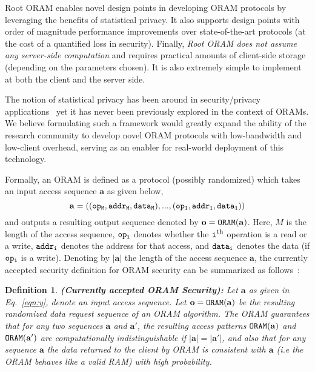 \documentclass[USenglish,oneside,twocolumn]{article}
\makeatletter
\newcommand{\ourprotocol}{Root ORAM}
\let\origsection\section
\renewcommand\section{\@ifstar{\starsection}{\nostarsection}}
\newcommand\nostarsection[1]
{\sectionprelude\origsection{#1}\sectionpostlude}
\newcommand\starsection[1]
{\sectionprelude\origsection*{#1}\sectionpostlude}
\newcommand\sectionprelude{\vspace{-1em}
}
\newcommand\sectionpostlude{\vspace{-1em}
}
\newtheorem{defn}{Definition}
\makeatother
\begin{document}
\ourprotocol{} enables novel design points in developing ORAM protocols by 
leveraging the benefits of statistical privacy. It also supports design 
points with order of magnitude performance improvements over state-of-the-art 
protocols (at the cost of a quantified loss in security). 
Finally, \textit{\ourprotocol{} does not assume any server-side computation} 
and requires practical amounts of client-side storage (depending on the 
parameters chosen). It is also extremely simple to implement at both the client 
and the server side.



 \section{Differentially Private ORAM}\label{sec:statisticaloram}

The notion of statistical privacy has been around in security/privacy applications~\cite{bellare1993efficient, liang2009information, mittal2012information} yet it has never been previously explored in the context of ORAMs. We believe formulating such a framework would greatly expand the ability of the research community to develop novel ORAM protocols with low-bandwidth and low-client overhead, serving as an enabler for real-world deployment of this technology.

Formally, an ORAM is defined as a protocol (possibly randomized) which takes an input access sequence $\mathbf{a}$ as given below,
\begin{equation}\label{eqn:y}
\mathbf{a} = {\tt ((op_{M},addr_{M},data_{M}),. . . , (op_1,addr_1,data_1)) }
\end{equation}
and outputs a resulting output sequence denoted by $\mathbf{o} = {\tt ORAM(\mathbf{a})}$. Here, $M$ is the length of the access sequence, ${\tt op_i}$ denotes whether the ${\tt i}^{\text{{\footnotesize th}}}$ operation is a read or a write, ${\tt addr_i}$ denotes the address for that access, and ${\tt data_i}$ denotes the data (if ${\tt op_i}$ is a write). Denoting by $|\mathbf{a}|$ the length of the access sequence $\mathbf{a}$, the currently accepted security definition for ORAM security can be summarized as follows~\cite{pathoram}:





\begin{defn}
\textbf{(Currently accepted ORAM Security): } \textit{Let $\mathbf{a}$ as given in Eq.~\ref{eqn:y}, denote an input access sequence. Let $\mathbf{o} = {\tt ORAM(\mathbf{a})}$ be the resulting randomized data request sequence of an ORAM algorithm. The ORAM guarantees that for any two sequences $\mathbf{a}$ and $\mathbf{a}'$, the resulting access patterns ${\tt ORAM(\mathbf{a})}$ and ${\tt ORAM(\mathbf{a}')}$ are computationally indistinguishable if $|\mathbf{a}| = |\mathbf{a}'|$, and also that for any sequence $\mathbf{a}$ the data returned to the client by ORAM is consistent with $\mathbf{a}$ (i.e the ORAM behaves like a valid RAM) with high probability.}
\end{defn}
\end{document}
